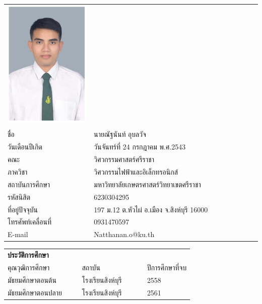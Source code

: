 \pagebreak
{}
\begin{center}
\begin{longtable}{@{}p{0.34\linewidth}@{}p{0.66\linewidth}@{}}
\includegraphics[scale=0.8,valign=c]{Chapters/img/nisit img/6230304295.PNG} & \\
    &\\
	ชื่อ							& นายณัฐนันท์ อุบลวัจ\\
	วันเดือนปีเกิด						& วันจันทร์ที่ 24 กรกฎาคม พ.ศ.2543\\
	คณะ							& วิศวกรรมศาสตร์ศรีราชา\\
	ภาควิชา							& วิศวกรรมไฟฟ้าและอิเล็กทรอนิกส์\\
	สถาบันการศึกษา						& มหาวิทยาลัยเกษตรศาสตร์วิทยาเขตศรีราชา\\
	รหัสนิสิต						& 6230304295\\
	ที่อยู่ปัจจุบัน						& 197 ม.12 ต.หัวไผ่ อ.เมือง จ.สิงห์บุรี 16000\\
	โทรศัพท์เคลื่อนที่					& 0931470597\\
	E-mail						& Natthanan.o@ku.th\\
\end{longtable}

\begin{longtable}{@{}p{0.4\linewidth}@{}p{0.35\linewidth}@{}p{0.25\linewidth}}
	\textbf{ประวัติการศึกษา} & &\\
	คุณวุฒิการศึกษา		&	สถาบัน				&	ปีการศึกษาที่จบ \\\hline
	มัธยมศึกษาตอนต้น	&	โรงเรียนสิงห์บุรี	&	2558 	\\
	มัธยมศึกษาตอนปลาย	&	โรงเรียนสิงห์บุรี	&	2561 	\\
\end{longtable}
\end{center}